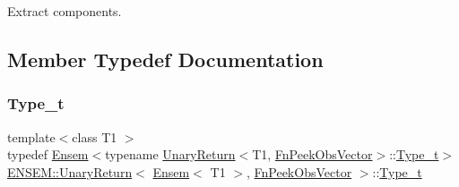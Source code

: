 Extract components. 

\subsection{Member Typedef Documentation}
\mbox{\label{structENSEM_1_1UnaryReturn_3_01Ensem_3_01T1_01_4_00_01FnPeekObsVector_01_4_a1dc591fee09e0be58d290f5f4062e2d7}} 
\subsubsection{\texorpdfstring{Type\_t}{Type\_t}\hspace{0.1cm}{\footnotesize\ttfamily [1/2]}}
{\footnotesize\ttfamily template$<$class T1 $>$ \\
typedef \mbox{\hyperlink{classENSEM_1_1Ensem}{Ensem}}$<$typename \mbox{\hyperlink{structENSEM_1_1UnaryReturn}{Unary\+Return}}$<$T1, \mbox{\hyperlink{structENSEM_1_1FnPeekObsVector}{Fn\+Peek\+Obs\+Vector}}$>$\+::\mbox{\hyperlink{structENSEM_1_1UnaryReturn_3_01Ensem_3_01T1_01_4_00_01FnPeekObsVector_01_4_a1dc591fee09e0be58d290f5f4062e2d7}{Type\+\_\+t}}$>$ \mbox{\hyperlink{structENSEM_1_1UnaryReturn}{E\+N\+S\+E\+M\+::\+Unary\+Return}}$<$ \mbox{\hyperlink{classENSEM_1_1Ensem}{Ensem}}$<$ T1 $>$, \mbox{\hyperlink{structENSEM_1_1FnPeekObsVector}{Fn\+Peek\+Obs\+Vector}} $>$\+::\mbox{\hyperlink{structENSEM_1_1UnaryReturn_3_01Ensem_3_01T1_01_4_00_01FnPeekObsVector_01_4_a1dc591fee09e0be58d290f5f4062e2d7}{Type\+\_\+t}}}

\mbox{\label{structENSEM_1_1UnaryReturn_3_01Ensem_3_01T1_01_4_00_01FnPeekObsVector_01_4_a1dc591fee09e0be58d290f5f4062e2d7}} 
